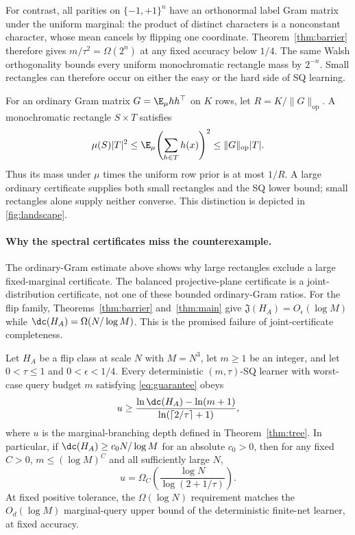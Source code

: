 For contrast, all parities on $\{-1,+1\}^n$ have an orthonormal label Gram matrix under the uniform marginal: the product of distinct characters is a nonconstant character, whose mean cancels by flipping one coordinate. Theorem~\ref{thm:barrier} therefore gives $m/\tau^2=\Omega(2^n)$ at any fixed accuracy below $1/4$. The same Walsh orthogonality bounds every uniform monochromatic rectangle mass by $2^{-n}$. Small rectangles can therefore occur on either the easy or the hard side of SQ learning.

For an ordinary Gram matrix $G=\E_\mu hh^\top$ on $K$ rows, let $R=K/\|G\|_{\mathrm{op}}$. A monochromatic rectangle $S\times T$ satisfies
\[
 \mu(S)|T|^2\le\E_\mu\!\left(\sum_{h\in T}h(x)\right)^2
 \le\|G\|_{\mathrm{op}}|T|.
\]
Thus its mass under $\mu$ times the uniform row prior is at most $1/R$. A large ordinary certificate supplies both small rectangles and the SQ lower bound; small rectangles alone supply neither converse. This distinction is depicted in \cref{fig:landscape}.



\paragraph{Why the spectral certificates miss the counterexample.}
The ordinary-Gram estimate above shows why large rectangles exclude a large fixed-marginal certificate. The balanced projective-plane certificate is a joint-distribution certificate, not one of these bounded ordinary-Gram ratios. For the flip family, Theorems~\ref{thm:barrier} and~\ref{thm:main} give $\mathfrak J(H_A)=O_\epsilon(\log M)$ while $\dc(H_A)=\Omega(N/\log M)$. This is the promised failure of joint-certificate completeness.


\begin{theorem}\label{thm:adapt}
Let $H_A$ be a flip class at scale $N$ with $M=N^3$, let $m\ge1$ be an integer, and let $0<\tau\le1$ and $0<\epsilon<1/4$. Every deterministic $(m,\tau)$-SQ learner with worst-case query budget $m$ satisfying \eqref{eq:guarantee} obeys
\[
 u\ge\frac{\ln\dc(H_A)-\ln(m+1)}
 {\ln(\lceil2/\tau\rceil+1)},
\]
where $u$ is the marginal-branching depth defined in Theorem~\ref{thm:tree}. In particular, if $\dc(H_A)\ge c_0N/\log M$ for an absolute $c_0>0$, then for any fixed $C>0$, $m\le(\log M)^C$ and all sufficiently large $N$,
\[
 u=\Omega_C\!\left(\frac{\log N}{\log(2+1/\tau)}\right).
\]
At fixed positive tolerance, the $\Omega(\log N)$ requirement matches the $O_d(\log M)$ marginal-query upper bound of the deterministic finite-net learner, at fixed accuracy.
\end{theorem}

